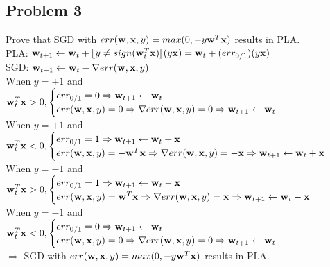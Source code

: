 \documentclass[12pt, a4paper]{article}
\begin{document}
\begin{CJK}{UTF8}{bkai}
	\section*{Problem 3}
		Prove that SGD with $err({\bf w,x},y)=max(0, -y{\bf w}^T{\bf x})$ results in PLA.\\
		PLA: ${\bf w}_{t+1} \leftarrow {\bf w}_t+\llbracket y\neq sign({\bf w}_t^T{\bf x})\rrbracket(y{\bf x}) = {\bf w}_t+(err_{0/1})(y{\bf x})$\\
		SGD: ${\bf w}_{t+1} \leftarrow {\bf w}_t-\nabla err({\bf w, x}, y)$\\
		When $y=+1$ and ${\bf w}_t^T{\bf x} > 0,
		\begin{cases}
		err_{0/1} = 0 \Rightarrow {\bf w}_{t+1}\leftarrow {\bf w}_t\\
		err({\bf w,x},y)=0 \Rightarrow\nabla err({\bf w,x},y)=0 \Rightarrow {\bf w}_{t+1}\leftarrow {\bf w}_t \\
		\end{cases}$\\
		When $y=+1$ and ${\bf w}_t^T{\bf x} < 0,
		\begin{cases}
		err_{0/1} = 1 \Rightarrow {\bf w}_{t+1}\leftarrow {\bf w}_t+{\bf x}\\
		err({\bf w,x},y)= -{\bf w}^T{\bf x}\Rightarrow\nabla err({\bf w,x},y)=-{\bf x} \Rightarrow {\bf w}_{t+1}\leftarrow {\bf w}_t+{\bf x} \\
		\end{cases}$\\
		When $y=-1$ and ${\bf w}_t^T{\bf x} > 0,
		\begin{cases}
		err_{0/1} = 1 \Rightarrow {\bf w}_{t+1}\leftarrow {\bf w}_t-{\bf x}\\
		err({\bf w,x},y)= {\bf w}^T{\bf x}\Rightarrow\nabla err({\bf w,x},y)={\bf x} \Rightarrow {\bf w}_{t+1}\leftarrow {\bf w}_t-{\bf x} \\
		\end{cases}$\\
		When $y=-1$ and ${\bf w}_t^T{\bf x} < 0,
		\begin{cases}
		err_{0/1} = 0 \Rightarrow {\bf w}_{t+1}\leftarrow {\bf w}_t\\
		err({\bf w,x},y)=0 \Rightarrow\nabla err({\bf w,x},y)=0 \Rightarrow {\bf w}_{t+1}\leftarrow {\bf w}_t \\
		\end{cases}$\\
		$\Rightarrow$ SGD with $err({\bf w,x},y)=max(0, -y{\bf w}^T{\bf x})$ results in PLA.


\end{CJK}
\end{document}
